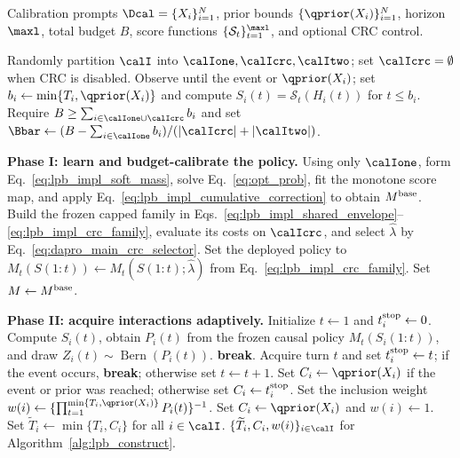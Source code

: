 
\begin{algorithm}[htbp]
\caption{Dynamic Allocation via PRojected Optimization (\textbf{\ttmethod})}
\label{alg:main_alg}
\small
\begin{algorithmic}[1]
\REQUIRE Calibration prompts \(\Dcal=\{X_i\}_{i=1}^{N}\), prior bounds
\(\{\qprior(X_i)\}_{i=1}^{N}\), horizon \(\maxl\), total budget \(B\), score
functions \(\{\mathcal S_t\}_{t=1}^{\maxl}\), and optional CRC control.

\STATE Randomly partition \(\calI\) into \(\calIone,\calIcrc,\calItwo\);
set \(\calIcrc=\emptyset\) when CRC is disabled.
    \STATE Observe until the event or \(\qprior(X_i)\); set
    \(b_i\gets\min\{T_i,\qprior(X_i)\}\) and compute
    \(S_i(t)=\mathcal S_t(H_i(t))\) for \(t\leq b_i\).
\ENDFOR
\STATE Require \(B\geq\sum_{i\in\calIone\cup\calIcrc}b_i\) and set
\(\Bbar\gets(B-\sum_{i\in\calIone}b_i)/(|\calIcrc|+|\calItwo|)\).

\STATE \textbf{Phase I: learn and budget-calibrate the policy.}
\STATE Using only \(\calIone\), form Eq.~\eqref{eq:lpb_impl_soft_mass}, solve
Eq.~\eqref{eq:opt_prob}, fit the monotone score map, and apply
Eq.~\eqref{eq:lpb_impl_cumulative_correction} to obtain \(M^{\rm base}\).
    \STATE Build the frozen capped family in
    Eqs.~\eqref{eq:lpb_impl_shared_envelope}--\eqref{eq:lpb_impl_crc_family},
    evaluate its costs on \(\calIcrc\), and select \(\widehat\lambda\) by
    Eq.~\eqref{eq:dapro_main_crc_selector}.
    \STATE Set the deployed policy to
    \(M_t(S(1{:}t))\gets M_t(S(1{:}t);\widehat\lambda)\) from
    Eq.~\eqref{eq:lpb_impl_crc_family}.
\ELSE
    \STATE Set \(M\gets M^{\rm base}\).
\ENDIF

\STATE \textbf{Phase II: acquire interactions adaptively.}
    \STATE Initialize \(t\gets1\) and \(t_i^{\rm stop}\gets0\).
        \STATE Compute \(S_i(t)\), obtain \(P_i(t)\) from the frozen causal
        policy \(M_t(S_i(1{:}t))\), and draw
        \(Z_i(t)\sim\operatorname{Bern}(P_i(t))\).
         \STATE \textbf{break}. \ENDIF
        \STATE Acquire turn \(t\) and set \(t_i^{\rm stop}\gets t\); if the
        event occurs, \textbf{break}; otherwise set \(t\gets t+1\).
    \ENDWHILE
    \STATE Set \(C_i\gets\qprior(X_i)\) if the event or prior was reached;
    otherwise set \(C_i\gets t_i^{\rm stop}\).
    \STATE Set the inclusion weight
    \(w(i)\gets\{\prod_{t=1}^{\min\{T_i,\qprior(X_i)\}}P_i(t)\}^{-1}\).
\ENDFOR
{}
    \STATE Set \(C_i\gets\qprior(X_i)\) and \(w(i)\gets1\).
\ENDFOR
\STATE Set \(\widetilde T_i\gets\min\{T_i,C_i\}\) for all \(i\in\calI\).
\RETURN \(\{\widetilde T_i,C_i,w(i)\}_{i\in\calI}\) for
Algorithm~\ref{alg:lpb_construct}.
\end{algorithmic}
\end{algorithm}
